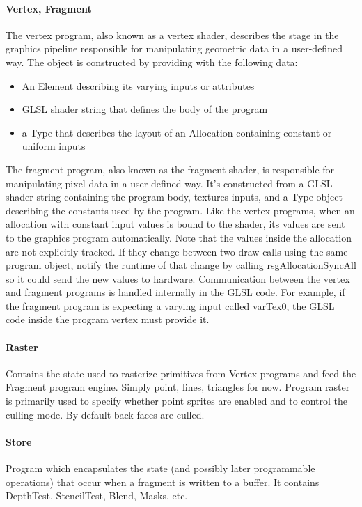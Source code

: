 \paragraph{Vertex, Fragment}
The \RS{} vertex program, also known as a vertex shader, describes the stage in the graphics pipeline responsible for manipulating geometric data in a user-defined way. The object is constructed by providing \RS{} with the following data:
\begin{itemize}
    \item An Element describing its varying inputs or attributes
    \item GLSL shader string that defines the body of the program
    \item a Type that describes the layout of an Allocation containing constant or uniform inputs
\end{itemize}

The \RS{} fragment program, also known as the fragment shader, is responsible for manipulating pixel data in a user-defined way. It's constructed from a GLSL shader string containing the program body, textures inputs, and a Type object describing the constants used by the program. Like the vertex programs, when an allocation with constant input values is bound to the shader, its values are sent to the graphics program automatically. Note that the values inside the allocation are not explicitly tracked. If they change between two draw calls using the same program object, notify the runtime of that change by calling rsgAllocationSyncAll so it could send the new values to hardware. Communication between the vertex and fragment programs is handled internally in the GLSL code. For example, if the fragment program is expecting a varying input called varTex0, the GLSL code inside the program vertex must provide it.

\paragraph{Raster}
Contains the state used to rasterize primitives from Vertex programs and feed the Fragment program engine. Simply point, lines, triangles for now.
Program raster is primarily used to specify whether point sprites are enabled and to control the culling mode. By default back faces are culled.

\paragraph{Store}
Program which encapsulates the state (and possibly later programmable operations) that occur when a fragment is written to a buffer. It contains DepthTest, StencilTest, Blend, Masks, etc.

